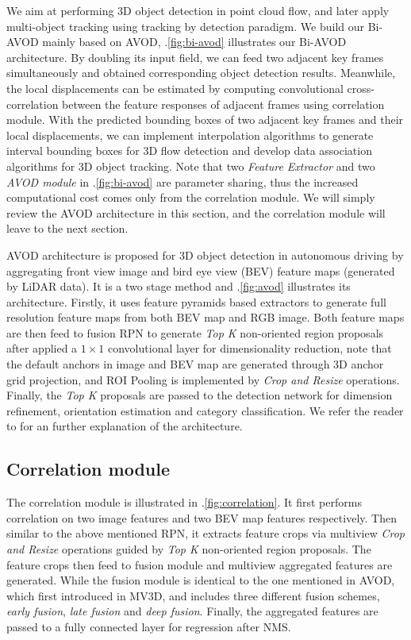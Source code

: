 \documentclass{bmvc2k}
\begin{document}
We aim at performing 3D object detection in point cloud flow, and later apply multi-object tracking using tracking by detection paradigm. We build our Bi-AVOD mainly based on AVOD\cite{ku2018joint}, \figurename .\ref{fig:bi-avod} illustrates our Bi-AVOD architecture. By doubling its input field, we can feed two adjacent key frames simultaneously and obtained corresponding object detection results. Meanwhile, the local displacements can be estimated by computing convolutional cross-correlation between the feature responses of adjacent frames using correlation module. With the predicted bounding boxes of two adjacent key frames and their local displacements, we can implement interpolation algorithms to generate interval bounding boxes for 3D flow detection and develop data association algorithms for 3D object tracking. Note that two \textit{Feature Extractor} and two \textit{AVOD module} in \figurename .\ref{fig:bi-avod} are parameter sharing, thus the increased computational cost comes only from the correlation module. We will simply review the AVOD architecture in this section, and the correlation module will leave to the next section.

AVOD architecture is proposed for 3D object detection in autonomous driving by aggregating front view image and bird eye view (BEV) feature maps (generated by LiDAR data). It is a two stage method and \figurename .\ref{fig:avod} illustrates its architecture. Firstly, it uses feature pyramids based extractors to generate full resolution feature maps from both BEV map and RGB image. Both feature maps are then feed to fusion RPN to generate \textit{Top K} non-oriented region proposals after applied a $1 \times 1$ convolutional layer for dimensionality reduction, note that the default anchors in image and BEV map are generated through 3D anchor grid projection, and ROI Pooling is implemented by \textit{Crop and Resize} operations. Finally, the \textit{Top K} proposals are passed to the detection network for dimension refinement, orientation estimation and category classification. We refer
the reader to \cite{ku2018joint} for an further explanation of the architecture.

\subsection{Correlation module}
The correlation module is illustrated in \figurename .\ref{fig:correlation}. It first performs correlation on two image features and two BEV map features respectively. Then similar to the above mentioned RPN, it extracts feature crops via multiview \textit{Crop and Resize} operations guided by \textit{Top K} non-oriented region proposals. The feature crops then feed to fusion module and multiview aggregated features are generated. While the fusion module is identical to the one mentioned in AVOD, which first introduced in MV3D\cite{chen2017multi}, and includes three different fusion schemes, \textit{early fusion}, \textit{late fusion} and \textit{deep fusion}. Finally, the aggregated features are passed to a fully connected layer for regression after NMS.
\end{document}
